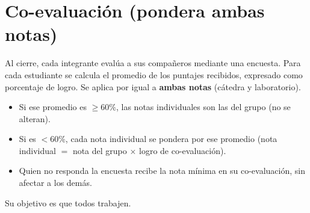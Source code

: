 \documentclass[11pt,letterpaper]{article}
\begin{document}
\section*{Co-evaluación (pondera ambas notas)}
Al cierre, cada integrante evalúa a sus compañeros mediante una encuesta. Para cada estudiante se calcula el
promedio de los puntajes recibidos, expresado como porcentaje de logro. Se aplica por igual a \textbf{ambas notas}
(cátedra y laboratorio).
\begin{itemize}
\item Si ese promedio es $\geq 60\%$, las notas individuales son las del grupo (no se alteran).
\item Si es $< 60\%$, cada nota individual se pondera por ese promedio (nota individual $=$ nota del grupo $\times$ logro de co-evaluación).
\item Quien no responda la encuesta recibe la nota mínima en su co-evaluación, sin afectar a los demás.
\end{itemize}
Su objetivo es que todos trabajen.
\end{document}

